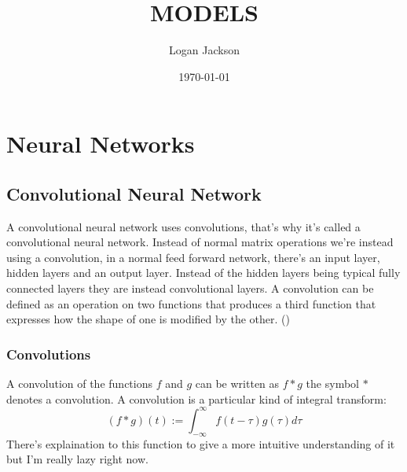 \documentclass[11pt]{article}
\author{Logan Jackson}
\date{\today}
\title{MODELS}
\begin{document}
\maketitle
\tableofcontents


\section{Neural Networks}
\label{sec:orgfb067f8}
\subsection{Convolutional Neural Network}
\label{sec:orgf3c3aa0}
A convolutional neural network uses convolutions, that's why it's called a convolutional neural network. Instead of normal matrix operations we're instead using a convolution, in a normal feed forward network, there's an input layer, hidden layers and an output layer. Instead of the hidden layers being typical fully connected layers they are instead convolutional layers. A convolution can be defined as an operation on two functions that produces a third function that expresses how the shape of one is modified by the other. (\cite{albawi2017})

\subsubsection{Convolutions}
\label{sec:org24d4053}
A convolution of the functions \(f\) and \(g\) can be written as \(f * g\) the symbol \(*\) denotes a convolution.
A convolution is a particular kind of integral transform:
$$
(f*g)(t) := \int_{-\infty}^{\infty}f(t - \tau)g(\tau) d\tau
$$
There's explaination to this function to give a more intuitive understanding of it but I'm really lazy right now.
\end{document}
